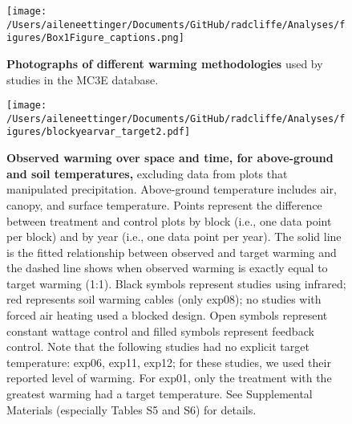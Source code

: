 \documentclass{article}
\begin{document}
\begin{figure}[h]
\centering
 \texttt{[image: /Users/aileneettinger/Documents/GitHub/radcliffe/Analyses/figures/Box1Figure\_captions.png]} 
 \caption{\textbf{Photographs of different warming methodologies} used by studies in the MC3E database.} 
\label{fig:exps}
\end{figure}
 


 \begin{figure}[h]
 \centering
 \texttt{[image: /Users/aileneettinger/Documents/GitHub/radcliffe/Analyses/figures/blockyearvar\_target2.pdf]} 
 \caption{\textbf{Observed warming over space and time, for above-ground and soil temperatures,} excluding data from plots that manipulated precipitation. Above-ground temperature includes air, canopy, and surface temperature. Points represent the difference between treatment and control plots by block (i.e., one data point per block) and by year (i.e., one data point per year). The solid line is the fitted relationship between observed and target warming and the dashed line shows when observed warming is exactly equal to target warming (1:1). Black symbols represent studies using infrared; red represents soil warming cables (only exp08); no studies with forced air heating used a blocked design. Open symbols represent constant wattage control and filled symbols represent feedback control. Note that the following studies had no explicit target temperature: exp06, exp11, exp12; for these studies, we used their reported level of warming. For exp01, only the treatment with the greatest warming had a target temperature. See Supplemental Materials (especially Tables S5 and S6) for details.}
 \label{fig:blockyear}
 \end{figure}
\end{document}
